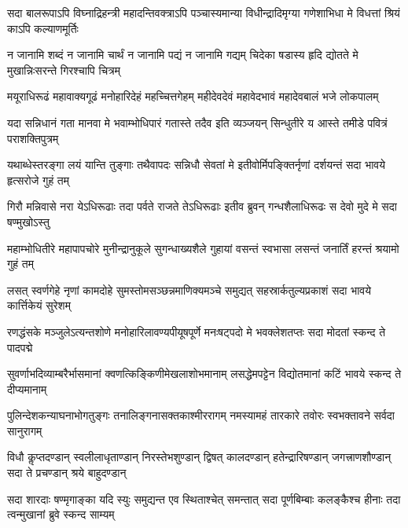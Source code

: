 \documentclass[a5paper,twoside,12pt]{book}
\begin{document}
\Large\setmainfont[Script=Devanagari,Mapping=tex-text]{Sanskrit 2003}
\begin{center}

\newpage
{}
\fourlineindentedshloka
{सदा बालरूपाऽपि विघ्नाद्रिहन्त्री}
{महादन्तिवक्त्राऽपि पञ्चास्यमान्या}
{विधीन्द्रादिमृग्या गणेशाभिधा मे}
{विधत्तां श्रियं काऽपि कल्याणमूर्तिः}

\fourlineindentedshloka
{न जानामि शब्दं न जानामि चार्थं}
{न जानामि पद्यं न जानामि गद्यम्}
{चिदेका षडास्य हृदि द्योतते मे}
{मुखान्निःसरन्ते गिरश्चापि चित्रम्}

\fourlineindentedshloka
{मयूराधिरूढं महावाक्यगूढं}
{मनोहारिदेहं महच्चित्तगेहम्}
{महीदेवदेवं महावेदभावं}
{महादेवबालं भजे लोकपालम्}

\fourlineindentedshloka
{यदा सन्निधानं गता मानवा मे}
{भवाम्भोधिपारं गतास्ते तदैव}
{इति व्यञ्जयन् सिन्धुतीरे य आस्ते}
{तमीडे पवित्रं पराशक्तिपुत्रम्}

\fourlineindentedshloka
{यथाब्धेस्तरङ्गा लयं यान्ति तुङ्गाः}
{तथैवापदः सन्निधौ सेवतां मे}
{इतीवोर्मिपङ्क्तिर्नृणां दर्शयन्तं}
{सदा भावये हृत्सरोजे गुहं तम्}

\fourlineindentedshloka
{गिरौ मन्निवासे नरा येऽधिरूढाः}
{तदा पर्वते राजते तेऽधिरूढाः}
{इतीव ब्रुवन् गन्धशैलाधिरूढः}
{स देवो मुदे मे सदा षण्मुखोऽस्तु}

\fourlineindentedshloka
{महाम्भोधितीरे महापापचोरे}
{मुनीन्द्रानुकूले सुगन्धाख्यशैले}
{गुहायां वसन्तं स्वभासा लसन्तं}
{जनार्तिं हरन्तं श्रयामो गुहं तम्}

\fourlineindentedshloka
{लसत् स्वर्णगेहे नृणां कामदोहे}
{सुमस्तोमसञ्छन्नमाणिक्यमञ्चे}
{समुद्यत् सहस्रार्कतुल्यप्रकाशं}
{सदा भावये कार्त्तिकेयं सुरेशम्}

\fourlineindentedshloka
{रणद्धंसके मञ्जुलेऽत्यन्तशोणे}
{मनोहारिलावण्यपीयूषपूर्णे}
{मनःषट्पदो मे भवक्लेशतप्तः}
{सदा मोदतां स्कन्द ते पादपद्मे}

\fourlineindentedshloka
{सुवर्णाभदिव्याम्बरैर्भासमानां}
{क्वणत्किङ्किणीमेखलाशोभमानाम्}
{लसद्धेमपट्टेन विद्योतमानां}
{कटिं भावये स्कन्द ते दीप्यमानाम्}

\fourlineindentedshloka
{पुलिन्देशकन्याघनाभोगतुङ्गः}
{तनालिङ्गनासक्तकाश्मीररागम्}
{नमस्यामहं तारकारे तवोरः}
{स्वभक्तावने सर्वदा सानुरागम्}

\fourlineindentedshloka
{विधौ कॢप्तदण्डान् स्वलीलाधृताण्डान्}
{निरस्तेभशुण्डान् द्विषत् कालदण्डान्}
{हतेन्द्रारिषण्डान् जगत्त्राणशौण्डान्}
{सदा ते प्रचण्डान् श्रये बाहुदण्डान्}

\fourlineindentedshloka
{सदा शारदाः षण्मृगाङ्का यदि स्युः}
{समुद्यन्त एव स्थिताश्चेत् समन्तात्}
{सदा पूर्णबिम्बाः कलङ्कैश्च हीनाः}
{तदा त्वन्मुखानां ब्रुवे स्कन्द साम्यम्}


\end{center}
\end{document}
